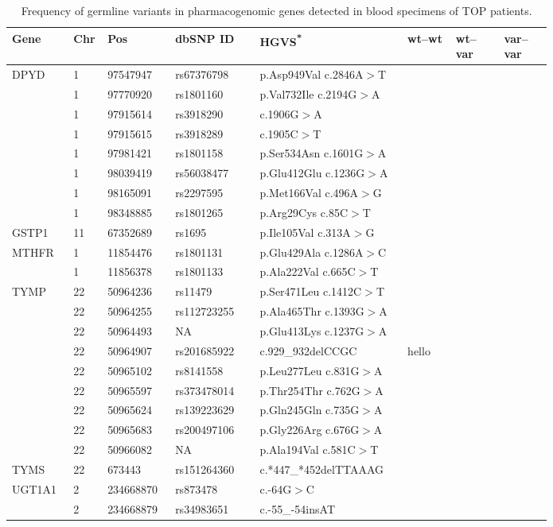 
\begin{longtable}{p{0.09\linewidth}|p{0.02\linewidth}p{0.1\linewidth}p{0.14\linewidth}p{0.2\linewidth}p{0.08\linewidth}p{0.08\linewidth}p{0.08\linewidth}}
\caption{Frequency of germline variants in pharmacogenomic genes detected in blood specimens of TOP patients.}
\label{tbl:freq_germline_pgx_genes}
		\\
		\hline
    Gene & Chr & Pos & dbSNP ID & HGVS\textsuperscript{*} & wt--wt & wt--var & var--var
		\\
		\hline
		DPYD & 1 & 97547947 & rs67376798 & p.Asp949Val c.2846A$>$T & & &
		\\
		& 1 & 97770920 & rs1801160 & p.Val732Ile c.2194G$>$A & & &
		\\
		& 1 & 97915614 & rs3918290 & c.1906G$>$A & & &
		\\
		& 1 & 97915615 & rs3918289 & c.1905C$>$T & & &
		\\
		& 1 & 97981421 & rs1801158 & p.Ser534Asn c.1601G$>$A & & &
		\\
		& 1 & 98039419 & rs56038477 & p.Glu412Glu c.1236G$>$A & & &
		\\
		& 1 & 98165091 & rs2297595 & p.Met166Val c.496A$>$G & & &
		\\
		& 1 & 98348885 & rs1801265 & p.Arg29Cys c.85C$>$T & & &
		\\
		\hline
		GSTP1 & 11 & 67352689 & rs1695 & p.Ile105Val c.313A$>$G & & &
		\\
		\hline
		MTHFR & 1 & 11854476 & rs1801131 & p.Glu429Ala c.1286A$>$C & & &
		\\
		& 1 & 11856378 & rs1801133 & p.Ala222Val c.665C$>$T & & &
		\\
		\hline
		TYMP & 22 & 50964236 & rs11479 & p.Ser471Leu c.1412C$>$T & & &
		\\
		& 22 & 50964255 & rs112723255 & p.Ala465Thr c.1393G$>$A & & &
		\\
		& 22 & 50964493 & NA & p.Glu413Lys c.1237G$>$A & & &
		\\
		& 22 & 50964907 & rs201685922 & c.929\_932delCCGC & hello & &
		\\
		& 22 & 50965102 & rs8141558 & p.Leu277Leu c.831G$>$A & & &
		\\
		& 22 & 50965597 & rs373478014 & p.Thr254Thr c.762G$>$A & & &
		\\
		& 22 & 50965624 & rs139223629 & p.Gln245Gln c.735G$>$A & & &
		\\
		& 22 & 50965683 & rs200497106 & p.Gly226Arg c.676G$>$A & & &
		\\
		& 22 & 50966082 & NA & p.Ala194Val c.581C$>$T & & &
		\\
		\hline
		TYMS & 22 & 673443 & rs151264360 & \footnotesize{c.*447\_*452delTTAAAG} & & &
		\\
		\hline
		UGT1A1 & 2 & 234668870 & rs873478 & c.-64G$>$C & & &
		\\
		& 2 & 234668879 & rs34983651 & c.-55\_-54insAT & & &
		\\
		\hline
\end{longtable}
